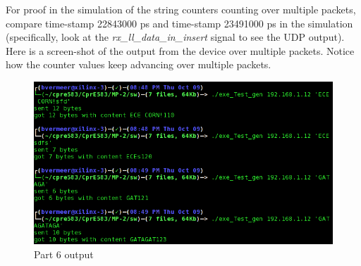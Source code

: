 \documentclass{article}
\begin{document}
For proof in the simulation of the string counters counting over multiple packets, compare time-stamp 22843000 ps and time-stamp 23491000 ps in the simulation (specifically, look at the \textit{rx\_ll\_data\_in\_insert} signal to see the UDP output). \\

Here is a screen-shot of the output from the device over multiple packets. Notice how the counter values keep advancing over multiple packets.

	\begin{figure}[H]
		\begin{center}
			\includegraphics[scale=0.65]{../part6_files/Part6_output_screenshot.png}
			\caption{Part 6 output}
		\end{center}
	\end{figure}








 
\end{document}
